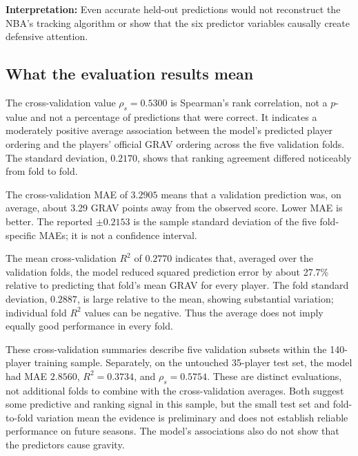 \documentclass[11pt]{article}
\begin{document}
\textbf{Interpretation:} Even accurate held-out predictions would not
reconstruct the NBA's tracking algorithm or show that the six predictor
variables causally create defensive attention.

\subsection{What the evaluation results mean}
The cross-validation value $\rho_s=0.5300$ is Spearman's rank correlation,
not a $p$-value and not a percentage of predictions that were correct. It
indicates a moderately positive average association between the model's
predicted player ordering and the players' official GRAV ordering across
the five validation folds. The standard deviation, $0.2170$, shows that
ranking agreement differed noticeably from fold to fold.

The cross-validation MAE of $3.2905$ means that a validation prediction
was, on average, about 3.29 GRAV points away from the observed score.
Lower MAE is better. The reported $\pm0.2153$ is the sample standard
deviation of the five fold-specific MAEs; it is not a confidence interval.

The mean cross-validation $R^2$ of $0.2770$ indicates that, averaged over
the validation folds, the model reduced squared prediction error by about
27.7\% relative to predicting that fold's mean GRAV for every player.
The fold standard deviation, $0.2887$, is large relative to the mean,
showing substantial variation; individual fold $R^2$ values can be
negative. Thus the average does not imply equally good performance in
every fold.

These cross-validation summaries describe five validation subsets within
the 140-player training sample. Separately, on the untouched 35-player
test set, the model had MAE $2.8560$, $R^2=0.3734$, and
$\rho_s=0.5754$. These are distinct evaluations, not additional folds
to combine with the cross-validation averages. Both suggest some
predictive and ranking signal in this sample, but the small test set and
fold-to-fold variation mean the evidence is preliminary and does not
establish reliable performance on future seasons. The model's associations
also do not show that the predictors cause gravity.
\end{document}
